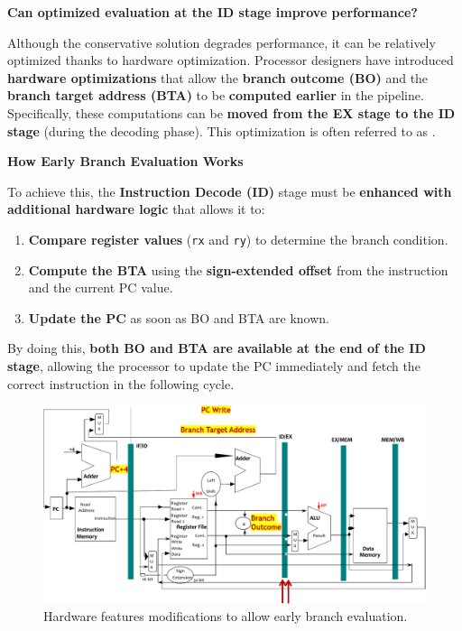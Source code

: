 \highspace
\begin{flushleft}
    \textcolor{Green3}{ \textbf{Can optimized evaluation at the ID stage improve performance?}}
\end{flushleft}
Although the conservative solution degrades performance, it can be relatively optimized thanks to hardware optimization. Processor designers have introduced \textbf{hardware optimizations} that allow the \textbf{branch outcome (BO)} and the \textbf{branch target address (BTA)} to be \textbf{computed earlier} in the pipeline. Specifically, these computations can be \textbf{moved from the EX stage to the ID stage} (during the decoding phase). This optimization is often referred to as .

\highspace
\begin{flushleft}
    \textcolor{Green3}{ \textbf{How Early Branch Evaluation Works}}
\end{flushleft}
To achieve this, the \textbf{Instruction Decode (ID)} stage must be \textbf{enhanced with additional hardware logic} that allows it to:
\begin{enumerate}
	\item \textbf{Compare register values} (\texttt{rx} and \texttt{ry}) to determine the branch condition.
	\item \textbf{Compute the BTA} using the \textbf{sign-extended offset} from the instruction and the current PC value.
	\item \textbf{Update the PC} as soon as BO and BTA are known.
\end{enumerate}
By doing this, \textbf{both BO and BTA are available at the end of the ID stage}, allowing the processor to update the PC immediately and fetch the correct instruction in the following cycle.

\begin{figure}[!htp]
	\centering
	\includegraphics[width=\textwidth]{img/early-branch-evaluation-hw.pdf}
	\caption{Hardware features modifications to allow early branch evaluation.}
\end{figure}

